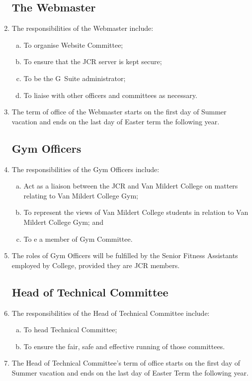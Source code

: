 \documentclass[12pt]{article}
\begin{document}
\begin{enumerate}
    \subsection{The Webmaster}
    \item The responsibilities of the Webmaster include:
    \begin{enumerate}[(a)]
        \item To organise Website Committee;
        \item To ensure that the JCR server is kept secure;
        \item To be the G~Suite administrator;
        \item To liaise with other officers and committees as necessary.
    \end{enumerate}
    \item The term of office of the Webmaster starts on the first day of Summer vacation and ends on the last day of Easter term the following year.

    \subsection{Gym Officers}
    \item The responsibilities of the Gym Officers include:
    \begin{enumerate}[(a)]
        \item Act as a liaison between the JCR and Van Mildert College on matters relating to Van Mildert College Gym;
        \item To represent the views of Van Mildert College students in relation to Van Mildert College Gym; and
        \item To e a member of Gym Committee.
    \end{enumerate}
    \item The roles of Gym Officers will be fulfilled by the Senior Fitness Assistants employed by College, provided they are JCR members.

    \subsection{Head of Technical Committee}
    \item The responsibilities of the Head of Technical Committee include:
    \begin{enumerate}[(a)]
        \item To head Technical Committee;
        \item To ensure the fair, safe and effective running of those committees.
    \end{enumerate}
    \item The Head of Technical Committee's term of office starts on the first day of Summer vacation and ends on the last day of Easter Term the following year.


\end{enumerate}
\end{document}
